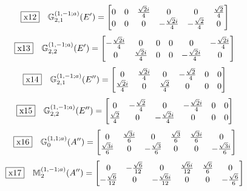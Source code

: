 \documentclass[fleqn,10pt,landscape]{jsarticle}
\begin{document}
\begin{dmath*}
\fbox{x12}\quad \mathbb{G}_{2,1}^{(1,-1;a)}(E^{\prime})=\begin{bmatrix} 0 & 0 & \frac{\sqrt{2} i}{4} & 0 & 0 & \frac{\sqrt{2}}{4} \\ 0 & 0 & 0 & - \frac{\sqrt{2} i}{4} & - \frac{\sqrt{2}}{4} & 0 \end{bmatrix}
\end{dmath*}
\begin{dmath*}
\fbox{x13}\quad \mathbb{G}_{2,2}^{(1,-1;a)}(E^{\prime})=\begin{bmatrix} - \frac{\sqrt{2} i}{4} & 0 & 0 & 0 & 0 & - \frac{\sqrt{2} i}{4} \\ 0 & \frac{\sqrt{2} i}{4} & 0 & 0 & - \frac{\sqrt{2} i}{4} & 0 \end{bmatrix}
\end{dmath*}
\begin{dmath*}
\fbox{x14}\quad \mathbb{G}_{2,1}^{(1,-1;a)}(E^{\prime\prime})=\begin{bmatrix} 0 & \frac{\sqrt{2} i}{4} & 0 & - \frac{\sqrt{2}}{4} & 0 & 0 \\ \frac{\sqrt{2} i}{4} & 0 & \frac{\sqrt{2}}{4} & 0 & 0 & 0 \end{bmatrix}
\end{dmath*}
\begin{dmath*}
\fbox{x15}\quad \mathbb{G}_{2,2}^{(1,-1;a)}(E^{\prime\prime})=\begin{bmatrix} 0 & - \frac{\sqrt{2}}{4} & 0 & - \frac{\sqrt{2} i}{4} & 0 & 0 \\ \frac{\sqrt{2}}{4} & 0 & - \frac{\sqrt{2} i}{4} & 0 & 0 & 0 \end{bmatrix}
\end{dmath*}
\begin{dmath*}
\fbox{x16}\quad \mathbb{G}_{0}^{(1,1;a)}(A^{\prime\prime})=\begin{bmatrix} 0 & \frac{\sqrt{3} i}{6} & 0 & \frac{\sqrt{3}}{6} & \frac{\sqrt{3} i}{6} & 0 \\ \frac{\sqrt{3} i}{6} & 0 & - \frac{\sqrt{3}}{6} & 0 & 0 & - \frac{\sqrt{3} i}{6} \end{bmatrix}
\end{dmath*}
\begin{dmath*}
\fbox{x17}\quad \mathbb{M}_{2}^{(1,-1;a)}(A^{\prime\prime})=\begin{bmatrix} 0 & - \frac{\sqrt{6}}{12} & 0 & \frac{\sqrt{6} i}{12} & \frac{\sqrt{6}}{6} & 0 \\ - \frac{\sqrt{6}}{12} & 0 & - \frac{\sqrt{6} i}{12} & 0 & 0 & - \frac{\sqrt{6}}{6} \end{bmatrix}
\end{dmath*}
\end{document}
